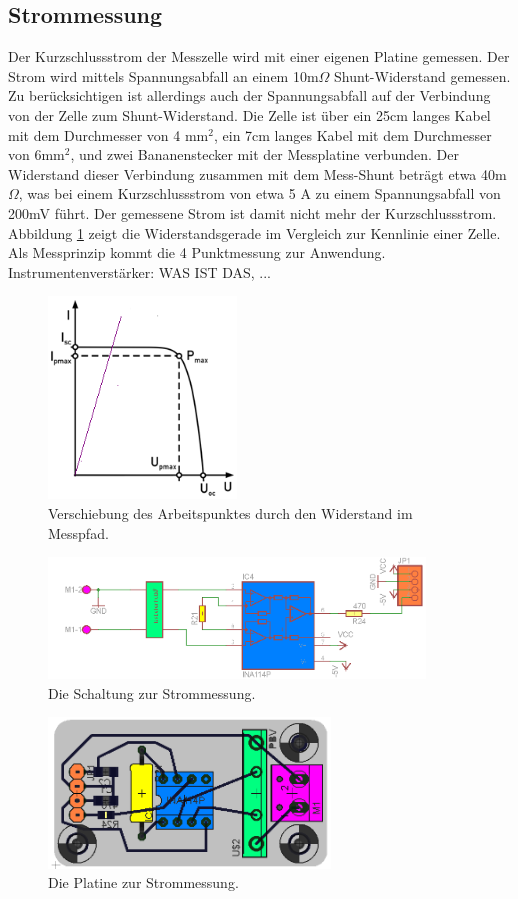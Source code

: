 \documentclass[a4paper,bibtotoc,oneside]{scrbook}
\begin{document}
\subsection{Strommessung}\thispagestyle{empty}
Der Kurzschlussstrom der Messzelle wird mit einer eigenen Platine gemessen. Der Strom wird mittels Spannungsabfall an einem 10m$\Omega$ Shunt-Widerstand gemessen. Zu berücksichtigen ist allerdings auch der Spannungsabfall auf der Verbindung von der Zelle zum Shunt-Widerstand.
Die Zelle ist über ein 25cm langes Kabel mit dem Durchmesser von 4 mm$^2$, ein 7cm langes Kabel mit dem Durchmesser von 6mm$^2$, und zwei Bananenstecker mit der Messplatine verbunden. Der Widerstand dieser Verbindung zusammen mit dem Mess-Shunt beträgt etwa 40m$\Omega$, was bei einem Kurzschlussstrom von etwa 5 A zu einem Spannungsabfall von 200mV führt. Der gemessene Strom ist damit nicht mehr der Kurzschlussstrom. Abbildung \ref{kenn2} zeigt die Widerstandsgerade im Vergleich zur Kennlinie einer Zelle.
Als Messprinzip kommt die 4 Punktmessung zur Anwendung. 
Instrumentenverstärker: WAS IST DAS, ...

\begin{figure}[htbp]
\centering
\includegraphics[width=50mm]{img/kenn2.png}
\caption{Verschiebung des Arbeitspunktes durch den Widerstand im Messpfad.}\label{kenn2}
\end{figure}

\begin{figure}[htbp]
\centering
\includegraphics[width=100mm]{img/i1.png}
\caption{Die Schaltung zur Strommessung.}\label{i1}
\end{figure}

\begin{figure}[htbp]
\centering
\includegraphics[width=75mm]{img/i2.png}
\caption{Die Platine zur Strommessung.}\label{i2}
\end{figure}
\end{document}
